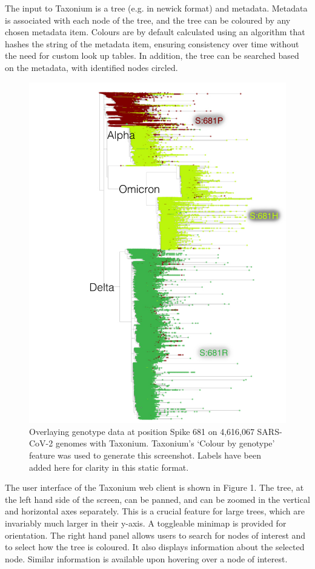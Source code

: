 The input to Taxonium is a tree (e.g. in newick format) and metadata. Metadata is associated with each node of the tree, and the tree can be coloured by any chosen metadata item. Colours are by default calculated using an algorithm that hashes the string of the metadata item, ensuring consistency over time without the need for custom look up tables. In addition, the tree can be searched based on the metadata, with identified nodes circled.

\begin{figure}
\begin{center}
\includegraphics[width=0.9\linewidth]{Figures/681.pdf}
\end{center}
\caption{Overlaying genotype data at position Spike 681 on 4,616,067 SARS-CoV-2 genomes with Taxonium. Taxonium's `Colour by genotype' feature was used to generate this screenshot. Labels have been added here for clarity in this static format.}
\label{fig:681}
\end{figure}

The user interface of the Taxonium web client is shown in Figure 1. The tree, at the left hand side of the screen, can be panned, and can be zoomed in the vertical and horizontal axes separately. This is a crucial feature for large trees, which are invariably much larger in their y-axis. A toggleable minimap is provided for orientation. The right hand panel allows users to search for nodes of interest and to select how the tree is coloured. It also displays information about the selected node. Similar information is available upon hovering over a node of interest.



